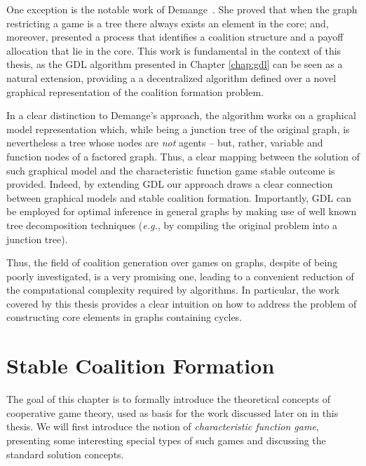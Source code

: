 \documentclass[11pt, twoside, titlepage, a4paper, openright]{report}
\begin{document}
One exception is the notable work of Demange~\cite{RePEc:ucp:jpolec:v:112:y:2004:i:4:p:754-778}. She proved that when the graph restricting a game is a tree there always exists an element in the core; and, moreover, presented a process that identifies a coalition structure and a payoff allocation that lie in the core. This work is fundamental in the context of this thesis, as the GDL algorithm presented in Chapter \ref{chap:gdl} can be seen as a natural extension, providing a a decentralized algorithm defined over a novel graphical representation of the coalition formation problem. 

\noindent In a clear distinction to Demange's approach, the algorithm works on a graphical model representation which, while being a junction tree of the original graph, is nevertheless a tree whose nodes are {\em not} agents -- but, rather, variable and function nodes of a factored graph. Thus, a clear mapping between the solution of such graphical model and the characteristic function game stable outcome is provided. Indeed, by extending GDL our approach draws a clear connection between graphical models and stable coalition formation. Importantly, GDL can be employed for optimal inference in general graphs by making use of well known tree decomposition techniques (\textit{e.g.}, by compiling the original problem into a junction tree).

Thus, the field of coalition generation over games on graphs, despite of being poorly investigated, is a very promising one, leading to a convenient reduction of the computational complexity required by algorithms. In particular, the work covered by this thesis provides a clear intuition on how to address the problem of constructing core elements in graphs containing cycles.


\chapter{Stable Coalition Formation}\label{chap:scf}

The goal of this chapter is to formally introduce the theoretical concepts of cooperative game theory, used as basis for the work discussed later on in this thesis. We will first introduce the notion of \textit{characteristic function game}, presenting some interesting special types of such games and discussing the standard solution concepts.
\end{document}
